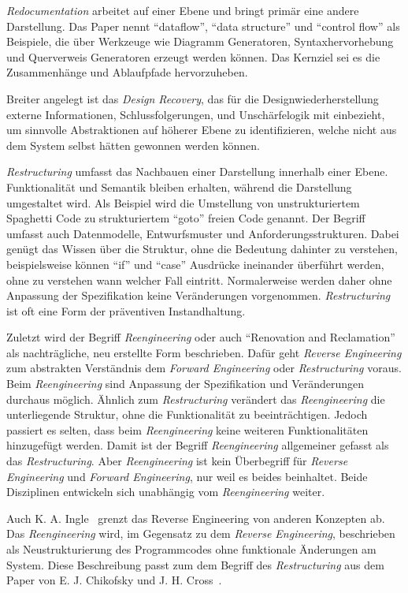 \textit{Redocumentation} arbeitet auf einer Ebene und bringt primär eine andere Darstellung.
Das Paper nennt "`dataflow"', "`data structure"' und "`control flow"' als Beispiele, die über Werkzeuge wie Diagramm Generatoren, Syntaxhervorhebung und Querverweis Generatoren erzeugt werden können.
Das Kernziel sei es die Zusammenhänge und Ablaufpfade hervorzuheben.

Breiter angelegt ist das \textit{Design Recovery}, das für die Designwiederherstellung externe Informationen, Schlussfolgerungen, und Unschärfelogik mit einbezieht, um sinnvolle Abstraktionen auf höherer Ebene zu identifizieren, welche nicht aus dem System selbst hätten gewonnen werden können.

\textit{Restructuring} umfasst das Nachbauen einer Darstellung innerhalb einer Ebene.
Funktionalität und Semantik bleiben erhalten, während die Darstellung umgestaltet wird.
Als Beispiel wird die Umstellung von unstrukturiertem Spaghetti Code zu strukturiertem "`goto"' freien Code genannt.
Der Begriff umfasst auch Datenmodelle, Entwurfsmuster und Anforderungsstrukturen.
Dabei genügt das Wissen über die Struktur, ohne die Bedeutung dahinter zu verstehen, beispielsweise können "`if"' und "`case"' Ausdrücke ineinander überführt werden, ohne zu verstehen wann welcher Fall eintritt.
Normalerweise werden daher ohne Anpassung der Spezifikation keine Veränderungen vorgenommen.
\textit{Restructuring} ist oft eine Form der präventiven Instandhaltung.

Zuletzt wird der Begriff \textit{Reengineering} oder auch "`Renovation and Reclamation"' als nachträgliche, neu erstellte Form beschrieben.
Dafür geht \textit{Reverse Engineering} zum abstrakten Verständnis dem \textit{Forward Engineering} oder \textit{Restructuring} voraus.
Beim \textit{Reengineering} sind Anpassung der Spezifikation und Veränderungen durchaus möglich.
Ähnlich zum \textit{Restructuring} verändert das \textit{Reengineering} die unterliegende Struktur, ohne die Funktionalität zu beeinträchtigen.
Jedoch passiert es selten, dass beim \textit{Reengineering} keine weiteren Funktionalitäten hinzugefügt werden.
Damit ist der Begriff \textit{Reengineering} allgemeiner gefasst als das \textit{Restructuring}.
Aber \textit{Reengineering} ist kein Überbegriff für \textit{Reverse Engineering} und \textit{Forward Engineering}, nur weil es beides beinhaltet.
Beide Disziplinen entwickeln sich unabhängig vom \textit{Reengineering} weiter.

Auch K. A. Ingle~\cite{Solr-153077417} grenzt das Reverse Engineering von anderen Konzepten ab.
Das \textit{Reengineering} wird, im Gegensatz zu dem \textit{Reverse Engineering}, beschrieben als Neustrukturierung des Programmcodes ohne funktionale Änderungen am System.
Diese Beschreibung passt zum dem Begriff des \textit{Restructuring} aus dem Paper von E. J. Chikofsky und J. H. Cross~\cite{43044}.

